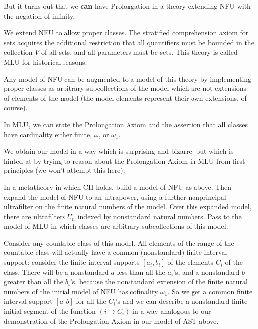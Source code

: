 \documentclass{slides}
\begin{document}
\begin{slide}

But it turns out that we {\bf can} have Prolongation in a theory extending NFU with the negation of infinity.

We extend NFU to allow proper classes.  The stratified comprehension axiom for sets acquires the additional restriction
that all quantifiers must be bounded in the collection $V$ of all sets, and all parameters must be sets.  This theory is called MLU for historical reasons.

Any model of NFU can be augmented to a model of this theory by implementing proper classes as arbitrary subcollections of the model which are not extensions of elements of the model (the model elements represent their own extensions, of course).

\end{slide}

\begin{slide}

In MLU, we can state the Prolongation Axiom and the assertion that all classes have cardinality either finite, $\omega$, or $\omega_1$.

We obtain our model in a way which is surprising and bizarre, but which is hinted at by trying to reason about the Prolongation Axiom in MLU from first principles (we won't attempt this here).

In a metatheory in which CH holds, build a model of NFU as above.  Then expand the model of NFU to an ultrapower, using a further nonprincipal ultrafilter on the finite natural numbers of the model.  Over this expanded model, there
are ultrafilters $U_n$ indexed by nonstandard natural numbers.  Pass to the model of MLU in which classes are arbitrary subcollections of this model.

\end{slide}

\begin{slide}



Consider any countable class of this model.   All elements of the range of the countable class will actually have a common (nonstandard) finite interval support:  consider the finite interval supports $[a_i,b_i]$ of the elements $C_i$ of the class.  There will be a nonstandard $a$ less than all the $a_i$'s, and a nonstandard $b$ greater than all the $b_i$'s, because the nonstandard extension of the finite natural numbers of the initial model of NFU has cofinality $\omega_1$.
So we get a common finite interval support $[a,b]$ for all the $C_i$'s and we can describe a nonstandard finite initial segment of the function $(i \mapsto C_i)$ in a way analogous to our demonstration of the Prolongation Axiom in our model of AST above.

\end{slide}
\end{document}

